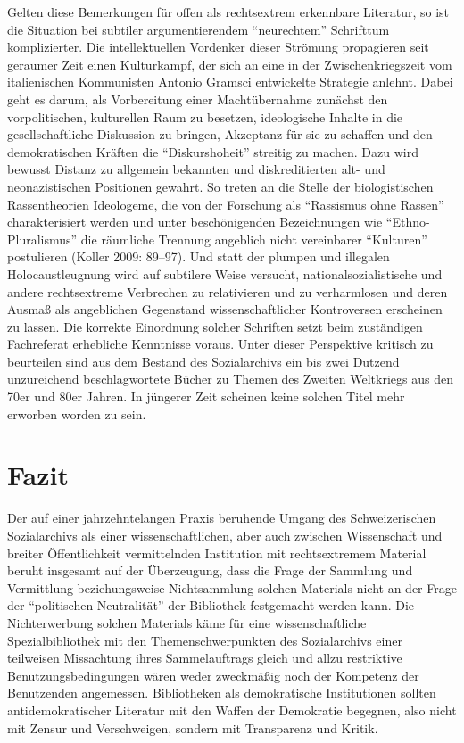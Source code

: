 \documentclass[a4paper,
fontsize=11pt,
oneside,
numbers=noperiodatend,
parskip=half-,
bibliography=totoc,
final
]{scrartcl}
\begin{document}
Gelten diese Bemerkungen für offen als rechtsextrem erkennbare
Literatur, so ist die Situation bei subtiler argumentierendem
\enquote{neurechtem} Schrifttum komplizierter. Die intellektuellen
Vordenker dieser Strömung propagieren seit geraumer Zeit einen
Kulturkampf, der sich an eine in der Zwischenkriegszeit vom
italienischen Kommunisten Antonio Gramsci entwickelte Strategie anlehnt.
Dabei geht es darum, als Vorbereitung einer Machtübernahme zunächst den
vorpolitischen, kulturellen Raum zu besetzen, ideologische Inhalte in
die gesellschaftliche Diskussion zu bringen, Akzeptanz für sie zu
schaffen und den demokratischen Kräften die \enquote{Diskurshoheit}
streitig zu machen. Dazu wird bewusst Distanz zu allgemein bekannten und
diskreditierten alt- und neonazistischen Positionen gewahrt. So treten
an die Stelle der biologistischen Rassentheorien Ideologeme, die von der
Forschung als \enquote{Rassismus ohne Rassen} charakterisiert werden und
unter beschönigenden Bezeichnungen wie \enquote{Ethno-Pluralismus} die
räumliche Trennung angeblich nicht vereinbarer \enquote{Kulturen}
postulieren (Koller 2009: 89--97). Und statt der plumpen und illegalen
Holocaustleugnung wird auf subtilere Weise versucht,
nationalsozialistische und andere rechtsextreme Verbrechen zu
relativieren und zu verharmlosen und deren Ausmaß als angeblichen
Gegenstand wissenschaftlicher Kontroversen erscheinen zu lassen. Die
korrekte Einordnung solcher Schriften setzt beim zuständigen Fachreferat
erhebliche Kenntnisse voraus. Unter dieser Perspektive kritisch zu
beurteilen sind aus dem Bestand des Sozialarchivs ein bis zwei Dutzend
unzureichend beschlagwortete Bücher zu Themen des Zweiten Weltkriegs aus
den 70er und 80er Jahren. In jüngerer Zeit scheinen keine solchen Titel
mehr erworben worden zu sein.

\hypertarget{fazit}{%
\section*{Fazit}\label{fazit}}

Der auf einer jahrzehntelangen Praxis beruhende Umgang des
Schweizerischen Sozialarchivs als einer wissenschaftlichen, aber auch
zwischen Wissenschaft und breiter Öffentlichkeit vermittelnden
Institution mit rechtsextremem Material beruht insgesamt auf der
Überzeugung, dass die Frage der Sammlung und Vermittlung beziehungsweise
Nichtsammlung solchen Materials nicht an der Frage der
\enquote{politischen Neutralität} der Bibliothek festgemacht werden
kann. Die Nichterwerbung solchen Materials käme für eine
wissenschaftliche Spezialbibliothek mit den Themenschwerpunkten des
Sozialarchivs einer teilweisen Missachtung ihres Sammelauftrags gleich
und allzu restriktive Benutzungsbedingungen wären weder zweckmäßig noch
der Kompetenz der Benutzenden angemessen. Bibliotheken als demokratische
Institutionen sollten antidemokratischer Literatur mit den Waffen der
Demokratie begegnen, also nicht mit Zensur und Verschweigen, sondern mit
Transparenz und Kritik.
\end{document}
